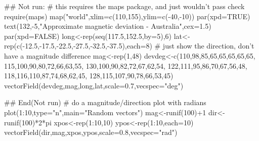 \begin{Examples}
\begin{ExampleCode}
 ## Not run: 
  # this requires the maps package, and just wouldn't pass check
  require(maps)
  map("world",xlim=c(110,155),ylim=c(-40,-10))
  par(xpd=TRUE)
  text(132,-5,"Approximate magnetic deviation - Australia",cex=1.5)
  par(xpd=FALSE)
  long<-rep(seq(117.5,152.5,by=5),6)
  lat<-rep(c(-12.5,-17.5,-22.5,-27.5,-32.5,-37.5),each=8)
  # just show the direction, don't have a magnitude difference
  mag<-rep(1,48)
  devdeg<-c(110,98,85,65,65,65,65,65,
   115,100,90,80,72,66,63,55,
   130,100,90,82,72,67,62,54,
   122,111,95,86,70,67,56,48,
   118,116,110,87,74,68,62,45,
   128,115,107,90,78,66,53,45)
  vectorField(devdeg,mag,long,lat,scale=0.7,vecspec="deg")
 
## End(Not run)
 # do a magnitude/direction plot with radians
 plot(1:10,type="n",main="Random vectors")
 mag<-runif(100)+1
 dir<-runif(100)*2*pi
 xpos<-rep(1:10,10)
 ypos<-rep(1:10,each=10)
 vectorField(dir,mag,xpos,ypos,scale=0.8,vecspec="rad")
\end{ExampleCode}
\end{Examples}

